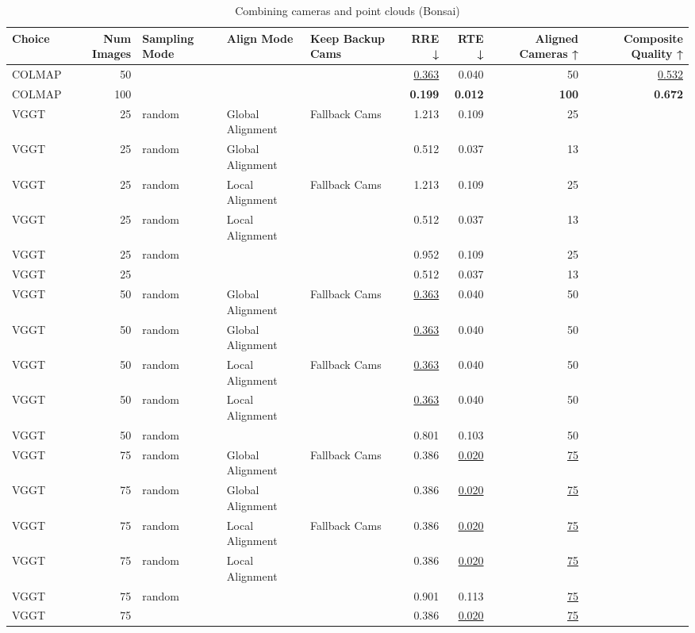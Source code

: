 \begin{table}[H]
\caption{Combining cameras and point clouds (Bonsai)}
\label{tab:07_combined_align_bonsai}
\begin{tabular}{lrlllrrrr}
\toprule
Choice & Num Images & Sampling Mode & Align Mode & Keep Backup Cams & RRE ↓ & RTE ↓ & Aligned Cameras ↑ & Composite Quality ↑ \\
\midrule
COLMAP & 50 &  &  &  & \underline{0.363} & 0.040 & 50 & \underline{0.532} \\
COLMAP & 100 &  &  &  & \textbf{0.199} & \textbf{0.012} & \textbf{100} & \textbf{0.672} \\
VGGT & 25 & random & Global Alignment & Fallback Cams & 1.213 & 0.109 & 25 &  \\
VGGT & 25 & random & Global Alignment &  & 0.512 & 0.037 & 13 &  \\
VGGT & 25 & random & Local Alignment & Fallback Cams & 1.213 & 0.109 & 25 &  \\
VGGT & 25 & random & Local Alignment &  & 0.512 & 0.037 & 13 &  \\
VGGT & 25 & random &  &  & 0.952 & 0.109 & 25 &  \\
VGGT & 25 &  &  &  & 0.512 & 0.037 & 13 &  \\
VGGT & 50 & random & Global Alignment & Fallback Cams & \underline{0.363} & 0.040 & 50 &  \\
VGGT & 50 & random & Global Alignment &  & \underline{0.363} & 0.040 & 50 &  \\
VGGT & 50 & random & Local Alignment & Fallback Cams & \underline{0.363} & 0.040 & 50 &  \\
VGGT & 50 & random & Local Alignment &  & \underline{0.363} & 0.040 & 50 &  \\
VGGT & 50 & random &  &  & 0.801 & 0.103 & 50 &  \\
VGGT & 75 & random & Global Alignment & Fallback Cams & 0.386 & \underline{0.020} & \underline{75} &  \\
VGGT & 75 & random & Global Alignment &  & 0.386 & \underline{0.020} & \underline{75} &  \\
VGGT & 75 & random & Local Alignment & Fallback Cams & 0.386 & \underline{0.020} & \underline{75} &  \\
VGGT & 75 & random & Local Alignment &  & 0.386 & \underline{0.020} & \underline{75} &  \\
VGGT & 75 & random &  &  & 0.901 & 0.113 & \underline{75} &  \\
VGGT & 75 &  &  &  & 0.386 & \underline{0.020} & \underline{75} &  \\

\end{tabular}
\end{table}
